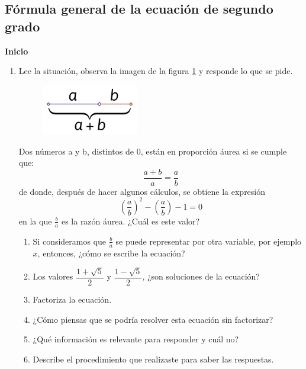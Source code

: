 \documentclass[11pt]{book}
\begin{document}
\newpage

\subsection{Fórmula general de la ecuación de segundo grado}

\begin{boxK}
    \begin{center}\textbf{Inicio}\end{center}
    \begin{enumerate}
        \item Lee la situación, observa la imagen de la figura \ref{fig:ayb} y responde lo que se pide.
              \begin{figure}[H]
                  \centering
                  \includegraphics[width=0.4\textwidth]{ayb.png}
                  \label{fig:ayb}
              \end{figure}
              \begin{boxF}
                  Dos números a y b, distintos de 0, están en proporción áurea si se cumple que:
                  \[\dfrac{a + b}{a}=\dfrac{a}{b}\]
                  de donde, después de hacer algunos cálculos, se obtiene la expresión
                  \[ \left(\dfrac{a}{b}\right)^2-\left(\dfrac{a}{b}\right)-1=0\]
                  en la que $\frac{b}{a}$ es la razón áurea. ¿Cuál es este valor?
              \end{boxF}
              \begin{enumerate}
                  \item Si consideramos que $\frac{b}{a}$ se puede representar por otra variable, por ejemplo $x$, entonces, ¿cómo se escribe la ecuación?
                  \item Los valores $\dfrac{1+\sqrt{5}}{2}$ y $\dfrac{1-\sqrt{5}}{2}$, ¿son soluciones de la ecuación?
                  \item Factoriza la ecuación.
                  \item ¿Cómo piensas que se podría resolver esta ecuación sin factorizar?
                  \item ¿Qué información es relevante para responder y cuál no?
                  \item Describe el procedimiento que realizaste para saber las respuestas.
              \end{enumerate}
    \end{enumerate}
\end{boxK}
\end{document}
